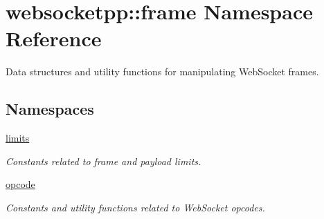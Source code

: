 \hypertarget{namespacewebsocketpp_1_1frame}{}\section{websocketpp\+:\+:frame Namespace Reference}
\label{namespacewebsocketpp_1_1frame}


Data structures and utility functions for manipulating Web\+Socket frames.  


\subsection*{Namespaces}
\begin{DoxyCompactItemize}
\item 
 \hyperlink{namespacewebsocketpp_1_1frame_1_1limits}{limits}
\begin{DoxyCompactList}\small\item\em Constants related to frame and payload limits. \end{DoxyCompactList}\item 
 \hyperlink{namespacewebsocketpp_1_1frame_1_1opcode}{opcode}
\begin{DoxyCompactList}\small\item\em Constants and utility functions related to Web\+Socket opcodes. \end{DoxyCompactList}\end{DoxyCompactItemize}
